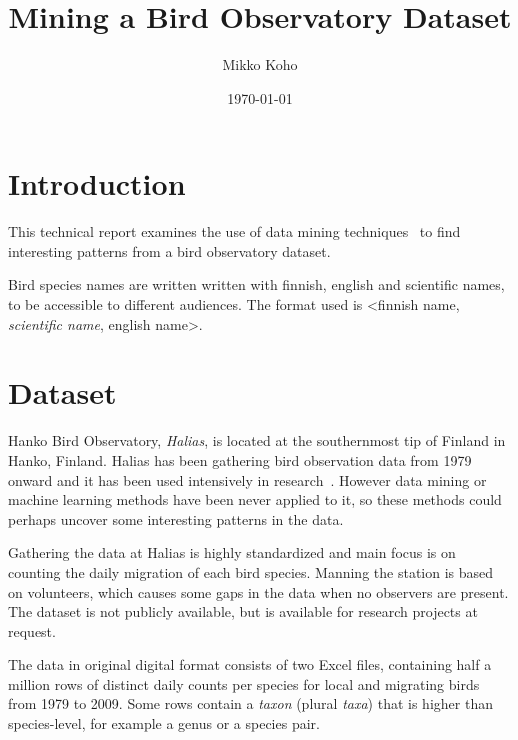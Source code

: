 \documentclass[english]{tktltiki2}
\title{Mining a Bird Observatory Dataset}
\author{Mikko Koho}
\date{\today}
\begin{document}
    

\frontmatter      %

\maketitle        %

\makeabstract     %

\tableofcontents  %


\mainmatter       %


\section{Introduction}

This technical report examines the use of data mining techniques~\cite{tan2006introduction} to find interesting patterns from a bird observatory dataset.

Bird species names are written written with finnish, english and scientific names, to be accessible to different audiences. The format used is <finnish name, \emph{scientific name}, english name>.


\section{Dataset}

Hanko Bird Observatory, \emph{Halias}, is located at the southernmost tip of Finland in Hanko, Finland. Halias has been gathering bird observation data from 1979 onward and it has been used intensively in research~\cite{HangonJulkaisut}. However data mining or machine learning methods have been never applied to it, so these methods could perhaps uncover some interesting patterns in the data.

Gathering the data at Halias is highly standardized and main focus is on counting the daily migration of each bird species. Manning the station is based on volunteers, which causes some gaps in the data when no observers are present.
The dataset is not publicly available, but is available for research projects at request.

The data in original digital format consists of two Excel files, containing half a million rows of distinct daily counts per species for local and migrating birds from 1979 to 2009. Some rows contain a \emph{taxon} (plural \emph{taxa}) that is higher than species-level, for example a genus or a species pair.
\end{document}
